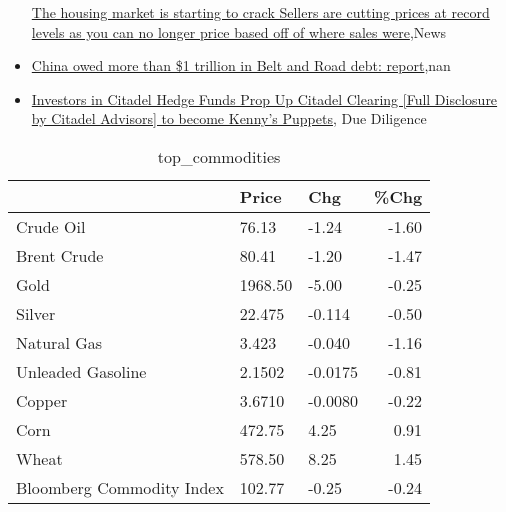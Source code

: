 \documentclass{article}%
\begin{document}
\begin{itemize}
\href{https://reddit.com/r/Economics/comments/17q32r1/the\_housing\_market\_is\_starting\_to\_crack\_sellers/}{The housing market is starting to crack  Sellers are cutting prices at record levels as you can no longer price based off of where sales were},News%
\item%
\href{https://reddit.com/r/Economics/comments/17q2p13/china\_owed\_more\_than\_1\_trillion\_in\_belt\_and\_road/}{China owed more than \$1 trillion in Belt and Road debt: report},nan%
\item%
\href{https://reddit.com/r/Superstonk/comments/17q90jc/investors\_in\_citadel\_hedge\_funds\_prop\_up\_citadel/}{Investors in Citadel Hedge Funds Prop Up Citadel Clearing [Full Disclosure by Citadel Advisors] to become Kenny's Puppets}, Due Diligence%
\end{itemize}%


\begin{table}[htbp]%
\caption{top\_commodities}%
\centering%
\begin{adjustbox}{width=1\textwidth}%
\begin{tabular}{lllr}
\toprule
                          &   Price &     Chg &  \%Chg \\
\midrule
               Crude Oil  &   76.13 &   -1.24 & -1.60 \\
             Brent Crude  &   80.41 &   -1.20 & -1.47 \\
                    Gold  & 1968.50 &   -5.00 & -0.25 \\
                  Silver  &  22.475 &  -0.114 & -0.50 \\
             Natural Gas  &   3.423 &  -0.040 & -1.16 \\
       Unleaded Gasoline  &  2.1502 & -0.0175 & -0.81 \\
                  Copper  &  3.6710 & -0.0080 & -0.22 \\
                    Corn  &  472.75 &    4.25 &  0.91 \\
                   Wheat  &  578.50 &    8.25 &  1.45 \\
Bloomberg Commodity Index &  102.77 &   -0.25 & -0.24 \\
\bottomrule
\end{tabular}
%
\end{adjustbox}%
\end{table}

%
\end{document}
